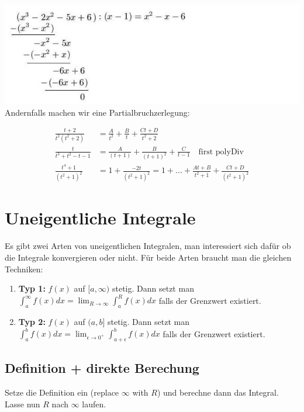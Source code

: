 \documentclass[25pt]{sciposter}
\begin{document}
\begin{multicols}{3}
\includegraphics[width=0.7\linewidth]{img/polyDiv.png}\\
Andernfalls machen wir eine Partialbruchzerlegung:

\begin{align*}
	\frac{t+2}{t^2(t^2 + 2)} &= \frac{A}{t^2} + \frac{B}{t} + \frac{Ct + D}{t^2 + 2}\\
	\frac{t}{t^3 + t^2 - t - 1} &= \frac{A}{(t+1)} + \frac{B}{(t+1)^2} + \frac{C}{t-1} \quad \text{first polyDiv}\\
	\frac{t^4 + 1}{(t^2 + 1)^2} &= 1 + \frac{-2t}{(t^2 + 1)^2} = 1 + \ldots + \frac{At + B}{t^2 + 1} + \frac{Ct + D}{(t^2 + 1)^2}
\end{align*}



\section*{Uneigentliche Integrale}


Es gibt zwei Arten von uneigentlichen Integralen, man interessiert sich dafür ob die Integrale konvergieren oder nicht. Für beide Arten braucht man die gleichen Techniken:

\begin{enumerate}
	\item[] \textbf{Typ 1:} $f(x)$ auf $[a,\infty)$ stetig. Dann setzt man $\int_{a}^{\infty} f(x) dx = \lim_{R \to \infty} \int_{a}^{R} f(x) dx$ falls der Grenzwert existiert.
	\item[] \textbf{Typ 2:} $f(x)$ auf $(a,b]$ stetig. Dann setzt man $\int_{a}^{b} f(x) dx= \lim_{\epsilon \to 0^+} \int_{a+\epsilon}^{b} f(x) dx$ falls der Grenzwert existiert.
\end{enumerate}


\subsection*{Definition + direkte Berechung}
Setze die Definition ein (replace $\infty$ with $R$) und berechne dann das Integral. Lasse nun $R$ nach $\infty$ laufen.


\end{multicols}
\end{document}
